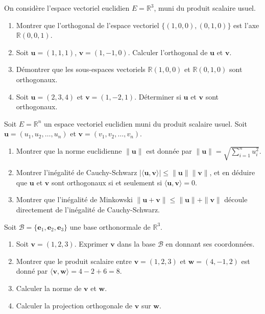 \begin{exercice}
On considère l’espace vectoriel euclidien \( E = \mathbb{R}^3 \), muni du produit scalaire usuel.

\begin{enumerate}
    \item Montrer que l'orthogonal de l'espace vectoriel \( \{ (1, 0, 0), (0, 1, 0) \} \) est l'axe \( \mathbb{R} (0, 0, 1) \).
    \item Soit \( \mathbf{u} = (1, 1, 1) \), \( \mathbf{v} = (1, -1, 0) \). Calculer l'orthogonal de \( \mathbf{u} \) et \( \mathbf{v} \).
    \item Démontrer que les sous-espaces vectoriels \( \mathbb{R} (1, 0, 0) \) et \( \mathbb{R} (0, 1, 0) \) sont orthogonaux.
    \item Soit \( \mathbf{u} = (2, 3, 4) \) et \( \mathbf{v} = (1, -2, 1) \). Déterminer si \( \mathbf{u} \) et \( \mathbf{v} \) sont orthogonaux.
\end{enumerate}
\end{exercice}
\begin{exercice}
Soit \( E = \mathbb{R}^n \) un espace vectoriel euclidien muni du produit scalaire usuel. Soit \( \mathbf{u} = (u_1, u_2, \ldots, u_n) \) et \( \mathbf{v} = (v_1, v_2, \ldots, v_n) \).

\begin{enumerate}
    \item Montrer que la norme euclidienne \( \| \mathbf{u} \| \) est donnée par \( \| \mathbf{u} \| = \sqrt{\sum_{i=1}^n u_i^2} \).
    \item Montrer l’inégalité de Cauchy-Schwarz \( | \langle \mathbf{u}, \mathbf{v} \rangle | \leq \| \mathbf{u} \| \| \mathbf{v} \| \), et en déduire que \( \mathbf{u} \) et \( \mathbf{v} \) sont orthogonaux si et seulement si \( \langle \mathbf{u}, \mathbf{v} \rangle = 0 \).
    \item Montrer que l’inégalité de Minkowski \( \| \mathbf{u} + \mathbf{v} \| \leq \| \mathbf{u} \| + \| \mathbf{v} \| \) découle directement de l’inégalité de Cauchy-Schwarz.
\end{enumerate}
\end{exercice}

\begin{exercice}
Soit \( \mathcal{B} = \{ \mathbf{e}_1, \mathbf{e}_2, \mathbf{e}_3 \} \) une base orthonormale de \( \mathbb{R}^3 \).

\begin{enumerate}
    \item Soit \( \mathbf{v} = (1, 2, 3) \). Exprimer \( \mathbf{v} \) dans la base \( \mathcal{B} \) en donnant ses coordonnées.
    \item Montrer que le produit scalaire entre \( \mathbf{v} = (1, 2, 3) \) et \( \mathbf{w} = (4, -1, 2) \) est donné par \( \langle \mathbf{v}, \mathbf{w} \rangle = 4 - 2 + 6 = 8 \).
    \item Calculer la norme de \( \mathbf{v} \) et \( \mathbf{w} \).
    \item Calculer la projection orthogonale de \( \mathbf{v} \) sur \( \mathbf{w} \).
\end{enumerate}
\end{exercice}


